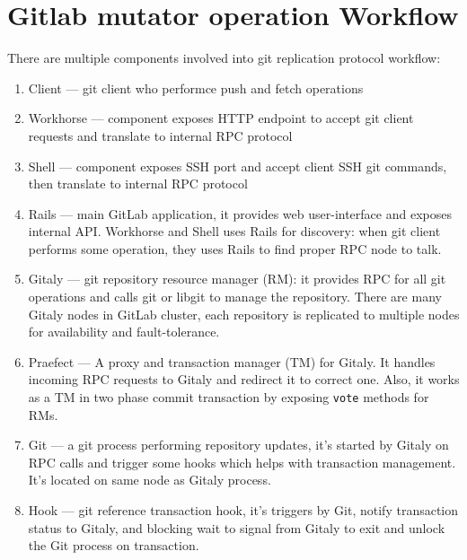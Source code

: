 \documentclass[acmlarge, screen, nonacm]{acmart}
\newcommand{\code}[1]{\texttt{#1}}
\begin{document}
\section{Gitlab mutator operation Workflow}
There are multiple components involved into git replication protocol workflow:
\begin{enumerate}
    \item Client --- git client who performce push and fetch operations
    \item Workhorse --- component exposes HTTP endpoint to accept
      git client requests and translate to internal RPC protocol
    \item Shell --- component exposes SSH port and accept client
      SSH git commands, then translate to internal RPC protocol
    \item Rails --- main GitLab application, it provides web user-interface
      and exposes internal API. Workhorse and Shell uses Rails
      for discovery: when git client performs some operation,
      they uses Rails to find proper RPC node to talk.
    \item Gitaly --- git repository resource manager (RM): it provides RPC
      for all git operations and calls git or libgit to manage
      the repository. There are many Gitaly nodes in GitLab cluster,
      each repository is replicated to multiple nodes for availability
      and fault-tolerance.
    \item Praefect --- A proxy and transaction manager (TM) for Gitaly. It handles
      incoming RPC requests to Gitaly and redirect it to correct one.
      Also, it works as a TM in two phase commit transaction by exposing
      \code{vote} methods for RMs.
    \item Git --- a git process performing repository updates, it's started by
      Gitaly on RPC calls and trigger some hooks which helps with transaction
      management. It's located on same node as Gitaly process.
    \item Hook --- git reference transaction hook, it's triggers by Git,
      notify transaction status to Gitaly, and blocking wait to signal from
      Gitaly to exit and unlock the Git process on transaction.
\end{enumerate}
\end{document}
